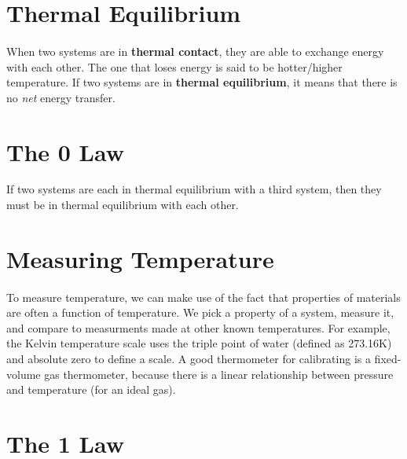 \documentclass[../thermodynamics.tex]{subfiles}
\begin{document}
    \section{Thermal Equilibrium}
        \paragraph{}
        When two systems are in \textbf{thermal contact}, they are able to exchange energy with each other.
        The one that loses energy is said to be hotter/higher temperature.
        If two systems are in \textbf{thermal equilibrium}, it means that there is no \textit{net} energy transfer.

    \section{The 0 Law}
        \begin{definition}
            If two systems are each in thermal equilibrium with a third system, then they must be in thermal equilibrium with each other.
        \end{definition}

    \section{Measuring Temperature}
        \paragraph{}
        To measure temperature, we can make use of the fact that properties of materials are often a function of temperature.
        We pick a property of a system, measure it, and compare to measurments made at other known temperatures.
        For example, the Kelvin temperature scale uses the triple point of water (defined as 273.16K) and absolute zero to define a scale.
        A good thermometer for calibrating is a fixed-volume gas thermometer, because there is a linear relationship between pressure and temperature (for an ideal gas).

    \section{The 1 Law}
\end{document}
